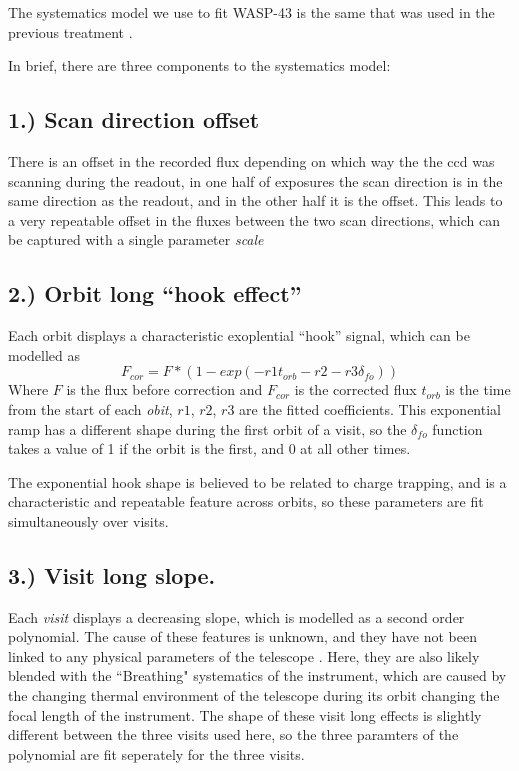 \documentclass[a4paper,fleqn,usenatbib]{mnras}
\begin{document}
The systematics model we use to fit WASP-43 is the same that was used in the previous treatment \citep{Stevenson2014}.

In brief, there are three components to the systematics model:
\subsection*{1.) Scan direction offset}

There is an offset in the recorded flux depending on which way the the ccd was scanning during the readout, in one half of exposures the scan direction is in the same direction as the readout, and in the other half it is the offset. This leads to a very repeatable offset in the fluxes between the two scan directions, which can be captured with a single parameter \emph{scale}

\subsection*{2.) Orbit long ``hook effect''}

Each orbit displays a characteristic exoplential ``hook'' signal, which can be modelled as
\begin{equation} \label{eq:hook}
F_{cor} = F*(1-exp(-r1 t_{orb}-r2-r3 \delta_{fo}))
\end{equation}
Where $F$ is the flux before correction and $F_{cor}$ is the corrected flux $t_{orb}$ is the time from the start of each \emph{obit}, $r1$, $r2$, $r3$ are the fitted coefficients. This exponential ramp has a different shape during the first orbit of a visit, so the $\delta_{fo}$ function takes a value of 1 if the orbit is the first, and 0 at all other times.

The exponential hook shape is believed to be related to charge trapping, and is a characteristic and repeatable feature across orbits, so these parameters are fit simultaneously over visits.

\subsection*{3.) Visit long slope. }

Each \emph{visit} displays a decreasing slope, which is modelled as a second order polynomial. The cause of these features is unknown, and they have not been linked to any physical parameters of the telescope \cite{Wakeford2016}. Here, they are also likely blended with the ``Breathing" systematics of the instrument, which are caused by the changing thermal environment of the telescope during its orbit changing the focal length of the instrument. The shape of these visit long effects is slightly different between the three visits used here, so the three paramters of the polynomial are fit seperately for the three visits.
\end{document}
